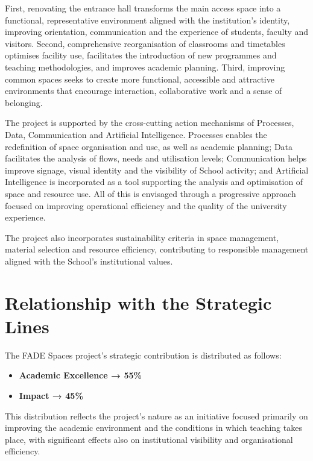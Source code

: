 \documentclass[11pt,a4paper]{scrreprt}
\begin{document}
First, renovating the entrance hall transforms the main access space into a functional, representative environment aligned with the institution's identity, improving orientation, communication and the experience of students, faculty and visitors. Second, comprehensive reorganisation of classrooms and timetables optimises facility use, facilitates the introduction of new programmes and teaching methodologies, and improves academic planning. Third, improving common spaces seeks to create more functional, accessible and attractive environments that encourage interaction, collaborative work and a sense of belonging.

The project is supported by the cross-cutting action mechanisms of Processes, Data, Communication and Artificial Intelligence. Processes enables the redefinition of space organisation and use, as well as academic planning; Data facilitates the analysis of flows, needs and utilisation levels; Communication helps improve signage, visual identity and the visibility of School activity; and Artificial Intelligence is incorporated as a tool supporting the analysis and optimisation of space and resource use. All of this is envisaged through a progressive approach focused on improving operational efficiency and the quality of the university experience.

The project also incorporates sustainability criteria in space management, material selection and resource efficiency, contributing to responsible management aligned with the School's institutional values.

\section{Relationship with the Strategic Lines}

\small
The FADE Spaces project's strategic contribution is distributed as follows:

\begin{itemize}[noitemsep,topsep=2pt]
\item \textbf{Academic Excellence → 55\%}
\item \textbf{Impact → 45\%}
\end{itemize}

This distribution reflects the project's nature as an initiative focused primarily on improving the academic environment and the conditions in which teaching takes place, with significant effects also on institutional visibility and organisational efficiency.
\end{document}
